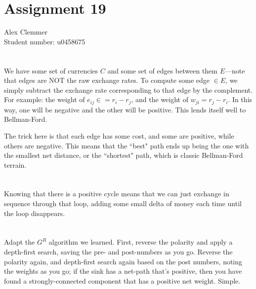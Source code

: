 \documentclass[a4paper]{article}
\begin{document}
\section*{Assignment 19}
Alex Clemmer\\
Student number: u0458675

\section{}

We have some set of currencies $C$ and some set of edges between them $E$---note that edges are NOT the raw exchange rates. To compute some edge $\in E$, we simply subtract the exchange rate corresponding to that edge by the complement. For example: the weight of $e_{ij} \in  = r_i - r_j$, and the weight of $w_{ji} = r_j - r_i$. In this way, one will be negative and the other will be positive. This lends itself well to Bellman-Ford.

The trick here is that each edge has some cost, and some are positive, while others are negative. This means that the ``best" path ends up being the one with the smallest net distance, or the ``shortest" path, which is classic Bellman-Ford terrain.

\section{}

Knowing that there is a positive cycle means that we can just exchange in sequence through that loop, adding some small delta of money each time until the loop disappears.

\section{}

Adapt the $G^R$ algorithm we learned. First, reverse the polarity and apply a depth-first search, saving the pre- and post-numbers as you go. Reverse the polarity again, and depth-first search again based on the post numbers, noting the weights as you go; if the sink has a net-path that's positive, then you have found a strongly-connected component that has a positive net weight. Simple.
\end{document}
